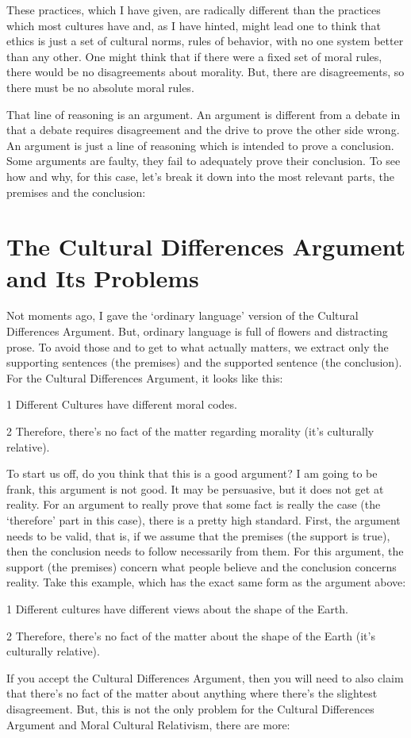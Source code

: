 These practices, which I have given, are radically different than the practices which most cultures have and, as I have hinted, might lead one to think that ethics is just a set of cultural norms, rules of behavior, with no one system better than any other. One might think that if there were a fixed set of moral rules, there would be no disagreements about morality. But, there are disagreements, so there must be no absolute moral rules. 

That line of reasoning is an argument. An argument is different from a debate in that a debate requires disagreement and the drive to prove the other side wrong. An argument is just a line of reasoning which is intended to prove a conclusion. Some arguments are faulty, they fail to adequately prove their conclusion. To see how and why, for this case, let's break it down into the most relevant parts, the premises and the conclusion:

\section{The Cultural Differences Argument and Its Problems}

Not moments ago, I gave the `ordinary language' version of the Cultural Differences Argument. But, ordinary language is full of flowers and distracting prose. To avoid those and to get to what actually matters, we extract only the supporting sentences (the premises) and the supported sentence (the conclusion). For the Cultural Differences Argument, it looks like this: 

\begin{earg}
\item[1] Different Cultures have different moral codes.
\item[2] Therefore, there's no fact of the matter regarding morality (it's culturally relative).
\end{earg}

To start us off, do you think that this is a good argument? I am going to be frank, this argument is not good. It may be persuasive, but it does not get at reality. For an argument to really prove that some fact is really the case (the `therefore' part in this case), there is a pretty high standard. First, the argument needs to be valid, that is, if we assume that the premises (the support is true), then the conclusion needs to follow necessarily from them. For this argument, the support (the premises) concern what people believe and the conclusion concerns reality. Take this example, which has the exact same form as the argument above:
\begin{earg}
\item[1] Different cultures have different views about the shape of the Earth.
\item[2] Therefore, there's no fact of the matter about the shape of the Earth (it's culturally relative).
\end{earg}
If you accept the Cultural Differences Argument, then you will need to also claim that there's no fact of the matter about anything where there's the slightest disagreement. But, this is not the only problem for the Cultural Differences Argument and Moral Cultural Relativism, there are more:

